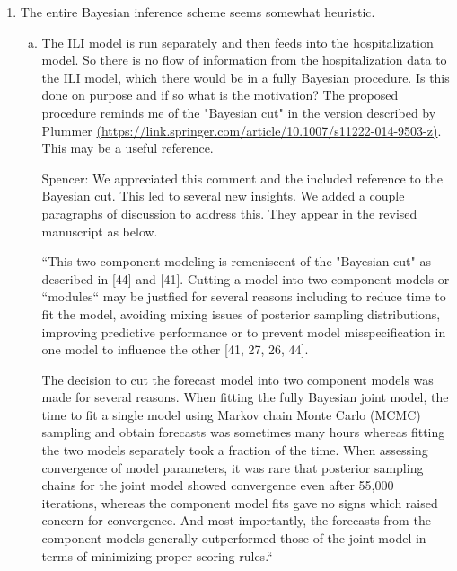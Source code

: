 \documentclass{article}
\newcommand{\spencer}[1]{{\color{blue} Spencer: #1}}
\begin{document}
\begin{enumerate}[1.]
\item The entire Bayesian inference scheme seems somewhat heuristic.

\begin{enumerate}[a.]
\item The ILI model is run separately and then feeds into the hospitalization model. So there is no
flow of information from the hospitalization data to the ILI model, which there would be in a fully
Bayesian procedure. Is this done on purpose and if so what is the motivation? The proposed
procedure reminds me of the "Bayesian cut" in the version described by Plummer
\href{(https://link.springer.com/article/10.1007/s11222-014-9503-z)}{(https://link.springer.com/article/10.1007/s11222-014-9503-z)}.
This may be a useful reference.

\spencer{We appreciated this comment and the included reference to the Bayesian
cut. This led to several new insights. 
We added a couple paragraphs of discussion to address this. They appear in
the revised manuscript as below.

``This two-component modeling is remeniscent of the "Bayesian cut" as 
described in [44] and [41]. Cutting a model
into two component models or ``modules`` may be justfied for several reasons
including to reduce time to fit the model, avoiding mixing issues of posterior
sampling distributions, improving predictive performance or to prevent
model misspecification in one model to influence the other 
[41, 27, 26, 44].

The decision to cut the forecast model into two component models
was made for several reasons.
When fitting the fully Bayesian joint model, the time to fit a single model using
Markov chain Monte Carlo (MCMC) sampling and
obtain forecasts was sometimes many hours whereas fitting the two models
separately took a fraction of the time. When assessing convergence of model
parameters, it was rare that posterior sampling chains for the joint model
showed convergence even after 55,000 iterations, whereas the component model 
fits gave no signs which raised concern for convergence. And most importantly,
the forecasts from the component models generally outperformed those of the 
joint model in terms of minimizing proper scoring rules.``}


\end{enumerate}
\end{enumerate}
\end{document}
